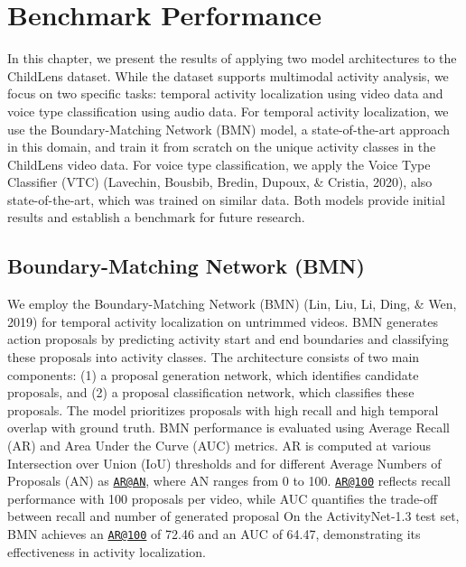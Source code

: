 \documentclass[
  man,floatsintext]{apa6}
\begin{document}
\section{Benchmark Performance}\label{benchmark-performance}

In this chapter, we present the results of applying two model architectures to the ChildLens dataset. While the dataset supports multimodal activity analysis, we focus on two specific tasks: temporal activity localization using video data and voice type classification using audio data. For temporal activity localization, we use the Boundary-Matching Network (BMN) model, a state-of-the-art approach in this domain, and train it from scratch on the unique activity classes in the ChildLens video data. For voice type classification, we apply the Voice Type Classifier (VTC) (Lavechin, Bousbib, Bredin, Dupoux, \& Cristia, 2020), also state-of-the-art, which was trained on similar data. Both models provide initial results and establish a benchmark for future research.

\subsection{Boundary-Matching Network (BMN)}\label{boundary-matching-network-bmn}

We employ the Boundary-Matching Network (BMN) (Lin, Liu, Li, Ding, \& Wen, 2019) for temporal activity localization on untrimmed videos. BMN generates action proposals by predicting activity start and end boundaries and classifying these proposals into activity classes. The architecture consists of two main components: (1) a proposal generation network, which identifies candidate proposals, and (2) a proposal classification network, which classifies these proposals. The model prioritizes proposals with high recall and high temporal overlap with ground truth.
BMN performance is evaluated using Average Recall (AR) and Area Under the Curve (AUC) metrics. AR is computed at various Intersection over Union (IoU) thresholds and for different Average Numbers of Proposals (AN) as \href{mailto:AR@AN}{\nolinkurl{AR@AN}}, where AN ranges from 0 to 100. \href{mailto:AR@100}{\nolinkurl{AR@100}} reflects recall performance with 100 proposals per video, while AUC quantifies the trade-off between recall and number of generated proposal On the ActivityNet-1.3 test set, BMN achieves an \href{mailto:AR@100}{\nolinkurl{AR@100}} of 72.46 and an AUC of 64.47, demonstrating its effectiveness in activity localization.
\end{document}
